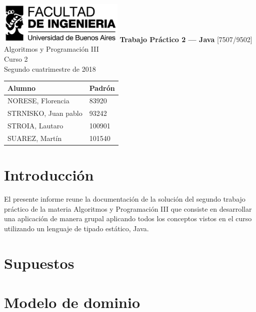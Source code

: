 \documentclass[titlepage,a4paper]{article}
\begin{document}
\begin{titlepage} %
	\hfill\includegraphics[width=6cm]{logofiuba.jpg}
    \centering
    \vfill
    \Huge \textbf{Trabajo Práctico 2 — Java}
    \vskip2cm
    \Large [7507/9502] Algoritmos y Programación III\\
    Curso 2 \\ %
    Segundo cuatrimestre de 2018 
    \vfill
    \begin{tabular}{ | l | l | } %
      \hline
      Alumno & Padrón \\ \hline
      NORESE, Florencia & 83920\\ \hline
      STRNISKO, Juan pablo & 93242\\ \hline
      STROIA, Lautaro & 100901\\ \hline
      SUAREZ, Martín & 101540\\ \hline
    \end{tabular}
    \vfill
    \vfill
\end{titlepage}

\tableofcontents %
\newpage

\section{Introducción}\label{sec:intro}
El presente informe reune la documentación de la solución del segundo trabajo práctico de la materia Algoritmos y Programación III que consiste en desarrollar una aplicación de manera grupal aplicando todos los conceptos vistos en el curso utilizando un lenguaje de tipado estático, Java.

\section{Supuestos}\label{sec:supuestos}




\section{Modelo de dominio}\label{sec:modelo}
\end{document}
